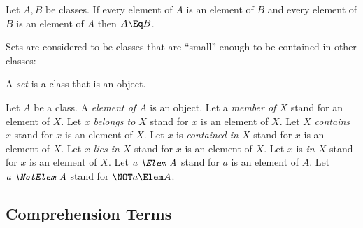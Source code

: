 \documentclass{stex}
\begin{document}
\begin{fakeforthel}
  \begin{axiom*}[title=Class Extensionality]
    Let $A,B$ be classes.
    If every element of $A$ is an element of $B$ and every element of $B$ is an element of $A$ then $A \Eq B$.
  \end{axiom*}
\end{fakeforthel}

Sets are considered to be classes that are ``small'' enough to be contained in
other classes:

\begin{fakeforthel}
  \begin{definition*}
    A \emph{set} is a class that is an object.
  \end{definition*}
\end{fakeforthel}

\begin{sparagraph}[style=symdoc,for={Elem,NotElem}]
  \begin{fakeforthel}
    \begin{signature*}
      Let $A$ be a class.
      A \emph{element of $A$} is an object.
      Let a \emph{member of $X$} stand for an element of $X$.
      Let $x$ \emph{belongs to $X$} stand for $x$ is an element of $X$.
      Let $X$ \emph{contains $x$} stand for $x$ is an element of $X$.
      Let $x$ is \emph{contained in $X$} stand for $x$ is an element of $X$.
      Let $x$ \emph{lies in $X$} stand for $x$ is an element of $X$.
      Let $x$ is \emph{in $X$} stand for $x$ is an element of $X$.
      Let $\emph{a \Elem A}$ stand for $a$ is an element of $A$.
      Let $\emph{a \NotElem A}$ stand for $\NOT a \Elem A$.
    \end{signature*}
  \end{fakeforthel}
\end{sparagraph}


\subsection{Comprehension Terms}\label{sec:comprehension-terms}
\end{document}
